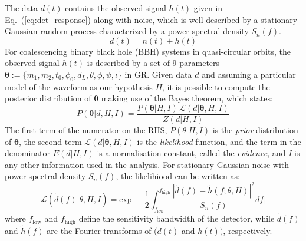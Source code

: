 \documentclass[prd,preprintnumbers,twocolumn,eqsecnum,floatfix,a4paper,nofootinbib,superscriptaddress]{revtex4}
\newcommand{\btheta}{\bm{\theta}}
\begin{document}
The data $d(t)$ contains the observed signal $h(t)$ given in Eq.~(\ref{eq:det_response}) along with noise, which is well described by a stationary Gaussian random process characterized by a power spectral density $S_n(f)$. 
\begin{equation}
d(t) = n(t) + h(t)
\label{eq:detector_strain}
\end{equation}
For coalescencing binary black hole (BBH) systems in quasi-circular orbits, the observed signal $h(t)$ is described by a set of 9 parameters $\btheta := \{m_1, m_2, t_0, \phi_0, d_L, \theta, \phi, \psi, \iota\}$ in GR. Given data $d$ and assuming a particular model of the waveform as our hypothesis $H$, it is possible to compute the posterior distribution of $\btheta$ making use of the Bayes theorem, which states: 
\begin{equation}
P(\btheta|d, H, I) = \frac{P(\btheta|H, I) \, \mathcal{L}(d|\btheta, H, I)}{Z(d|H, I)}
\label{eq:Bayes_theorem}
\end{equation} 
The first term of the numerator on the RHS, $P(\theta|H,I)$ is the \emph{prior} distribution of $\btheta$, the second term $\mathcal{L}(d|\btheta, H,I)$ is the \emph{likelihood} function, and the term in the denominator $E(d|H,I)$ is a normalisation constant, called the \emph{evidence}, and \emph{I} is any other information used in the analysis. For stationary Gaussian noise with power spectral density $S_n(f)$, the likelihiood can be written as:
\begin{equation}
\mathcal{L}(\tilde{d}(f)|\theta, H,I) = \text{exp}\Big[ -\frac{1}{2}\int_{f_\mathrm{low}}^{f_\mathrm{high}} \frac{|\tilde{d}(f) - \tilde{h}(f;\theta, H)|^2}{S_n(f)}df\Big]
\end{equation}
where $f_\mathrm{low}$ and $f_\mathrm{high}$ define the sensitivity bandwidth of the detector, while $\tilde{d}(f)$ and $\tilde{h}(f)$ are the Fourier transforms of $(d(t)$ and $h(t))$, respectively. 
\end{document}
